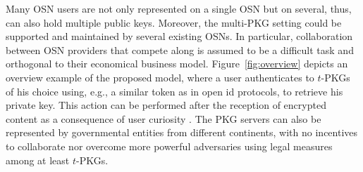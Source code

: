 \documentclass{llncs}
\newcommand{\figref}[1]{{Figure}~\ref{#1}}
\begin{document}
Many OSN users are not only represented on a single OSN but on several, thus, can also hold multiple public keys. Moreover, the multi-PKG setting could be supported and maintained by several existing OSNs. In particular, collaboration between OSN providers that compete along is assumed to be a difficult task and orthogonal to their economical business model. 
\figref{fig:overview} depicts an overview example of the proposed model, where a user authenticates to $t$-PKGs of his choice using, e.g., a similar token as in open id protocols, to retrieve his private key. This action can be performed after the reception of encrypted content as a consequence of user curiosity .
The PKG servers can also be represented by governmental entities from different continents, with no incentives to collaborate nor overcome more powerful adversaries using legal measures~\cite{facebook-subpoena} among at least $t$-PKGs. 
\end{document}
